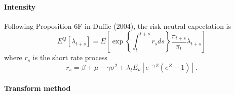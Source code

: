 \documentclass[11pt]{article}
\begin{document}
\paragraph{Intensity}

Following Proposition 6F in Duffie (2004), the risk neutral expectation is
\begin{equation}\label{eq:risk_neutral_exp_definition}
    E^Q\left[\lambda_{t+s}\right] = E\left[\exp\left\{\int_t^{t+s} r_s ds\right\}\frac{\pi_{t+s}}{\pi_t}\lambda_{t+s}\right]
\end{equation}
where $r_s$ is the short rate process
\[r_s = \beta + \mu - \gamma\sigma^2 + \lambda_tE_\nu\left[e^{-\gamma Z}(e^Z - 1)\right].\]

\paragraph{Transform method} 
\end{document}
